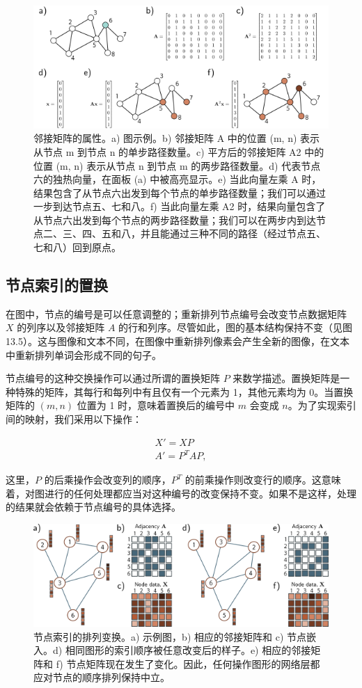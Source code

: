 \begin{figure}[ht!]
\centering
\includegraphics[width=0.7\linewidth]{png/chapter13/GraphAdjacencyMultiply.png}
\caption{邻接矩阵的属性。a) 图示例。b) 邻接矩阵 A 中的位置 (m, n) 表示从节点 m 到节点 n 的单步路径数量。c) 平方后的邻接矩阵 A2 中的位置 (m, n) 表示从节点 n 到节点 m 的两步路径数量。d) 代表节点六的独热向量，在面板 (a) 中被高亮显示。e) 当此向量左乘 A 时，结果包含了从节点六出发到每个节点的单步路径数量；我们可以通过一步到达节点五、七和八。f) 当此向量左乘 A2 时，结果向量包含了从节点六出发到每个节点的两步路径数量；我们可以在两步内到达节点二、三、四、五和八，并且能通过三种不同的路径（经过节点五、七和八）回到原点。}
\end{figure}


\subsection{节点索引的置换}
在图中，节点的编号是可以任意调整的；重新排列节点编号会改变节点数据矩阵 \(X\) 的列序以及邻接矩阵 \(A\) 的行和列序。尽管如此，图的基本结构保持不变（见图 13.5）。这与图像和文本不同，在图像中重新排列像素会产生全新的图像，在文本中重新排列单词会形成不同的句子。

节点编号的这种交换操作可以通过所谓的置换矩阵 \(P\) 来数学描述。置换矩阵是一种特殊的矩阵，其每行和每列中有且仅有一个元素为 1，其他元素均为 0。当置换矩阵的 \((m, n)\) 位置为 1 时，意味着置换后的编号中 \(m\) 会变成 \(n\)。为了实现索引间的映射，我们采用以下操作：


\begin{align}
X' = XP \\
A' = P^TAP, 
\end{align} 


这里，\(P\) 的后乘操作会改变列的顺序，\(P^T\) 的前乘操作则改变行的顺序。这意味着，对图进行的任何处理都应当对这种编号的改变保持不变。如果不是这样，处理的结果就会依赖于节点编号的具体选择。

\begin{figure}[ht!]
\centering
\includegraphics[width=0.7\linewidth]{png/chapter13/GraphNodeEquiv.png}
\caption{节点索引的排列变换。a) 示例图，b) 相应的邻接矩阵和 c) 节点嵌入。d) 相同图形的索引顺序被任意改变后的样子。e) 相应的邻接矩阵和 f) 节点矩阵现在发生了变化。因此，任何操作图形的网络层都应对节点的顺序排列保持中立。}
\end{figure}


